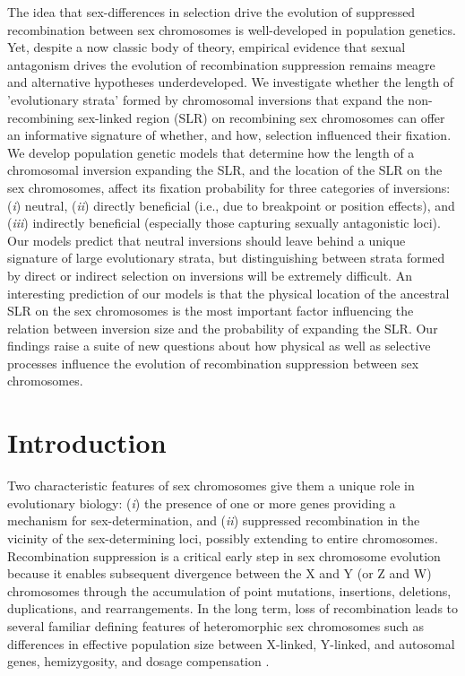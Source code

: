 \documentclass{article}[12pt]
\begin{document}
\noindent{} The idea that sex-differences in selection drive the evolution of suppressed recombination between sex chromosomes is well-developed in population genetics. Yet, despite a now classic body of theory, empirical evidence that sexual antagonism drives the evolution of recombination suppression remains meagre and alternative hypotheses underdeveloped. We investigate whether the length of 'evolutionary strata' formed by chromosomal inversions that expand the non-recombining sex-linked region (SLR) on recombining sex chromosomes can offer an informative signature of whether, and how, selection influenced their fixation. We develop population genetic models that determine how the length of a chromosomal inversion expanding the SLR, and the location of the SLR on the sex chromosomes, affect its fixation probability for three categories of inversions: ({\itshape i}) neutral, ({\itshape ii}) directly beneficial (i.e., due to breakpoint or position effects), and ({\itshape iii}) indirectly beneficial (especially those capturing sexually antagonistic loci). Our models predict that neutral inversions should leave behind a unique signature of large evolutionary strata, but distinguishing between strata formed by direct or indirect selection on inversions will be extremely difficult. An interesting prediction of our models is that the physical location of the ancestral SLR on the sex chromosomes is the most important factor influencing the relation between inversion size and the probability of expanding the SLR. Our findings raise a suite of new questions about how physical as well as selective processes influence the evolution of recombination suppression between sex chromosomes.
\newpage{}


\section*{Introduction} \label{sec:Introduction}

Two characteristic features of sex chromosomes give them a unique role in evolutionary biology: ({\itshape i}) the presence of one or more genes providing a mechanism for sex-determination, and ({\itshape ii}) suppressed recombination in the vicinity of the sex-determining loci, possibly extending to entire chromosomes. Recombination suppression is a critical early step in sex chromosome evolution because it enables subsequent divergence between the X and Y (or Z and W) chromosomes through the accumulation of point mutations, insertions, deletions, duplications, and rearrangements. In the long term, loss of recombination leads to several familiar defining features of heteromorphic sex chromosomes such as differences in effective population size between X-linked, Y-linked, and autosomal genes, hemizygosity, and dosage compensation \citep{CharlesworthMarais2005, BergeroCharlesworth2009,BeukeboomPerrin2014}.
	
\end{document}
